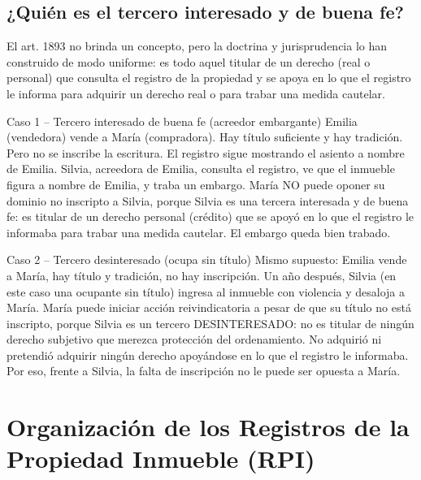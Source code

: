 \documentclass[12pt,oneside]{book}
\begin{document}
\section{¿Quién es el tercero interesado y de buena fe?}
\label{sec:tercero-interesado}

El art. 1893 no brinda un concepto, pero la doctrina y jurisprudencia lo han construido de modo uniforme: es todo aquel titular de un derecho (real o personal) que consulta el registro de la propiedad y se apoya en lo que el registro le informa para adquirir un derecho real o para trabar una medida cautelar.

\begin{example}{Caso 1 -- Tercero interesado de buena fe (acreedor embargante)}
Emilia (vendedora) vende a María (compradora). Hay título suficiente y hay tradición. Pero no se inscribe la escritura. El registro sigue mostrando el asiento a nombre de Emilia. Silvia, acreedora de Emilia, consulta el registro, ve que el inmueble figura a nombre de Emilia, y traba un embargo. María NO puede oponer su dominio no inscripto a Silvia, porque Silvia es una tercera interesada y de buena fe: es titular de un derecho personal (crédito) que se apoyó en lo que el registro le informaba para trabar una medida cautelar. El embargo queda bien trabado.
\end{example}

\begin{example}{Caso 2 -- Tercero desinteresado (ocupa sin título)}
Mismo supuesto: Emilia vende a María, hay título y tradición, no hay inscripción. Un año después, Silvia (en este caso una ocupante sin título) ingresa al inmueble con violencia y desaloja a María. María puede iniciar acción reivindicatoria a pesar de que su título no está inscripto, porque Silvia es un tercero DESINTERESADO: no es titular de ningún derecho subjetivo que merezca protección del ordenamiento. No adquirió ni pretendió adquirir ningún derecho apoyándose en lo que el registro le informaba. Por eso, frente a Silvia, la falta de inscripción no le puede ser opuesta a María.
\end{example}


\chapter{Organización de los Registros de la Propiedad Inmueble (RPI)}
\label{chap:organizacion-rpi}
\end{document}
